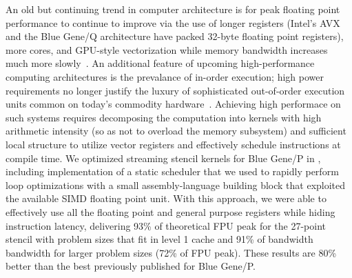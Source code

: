 An old \cite{mccalpin2007stream} but continuing trend in computer architecture is for peak floating point performance to continue to improve via the use of longer registers (Intel's AVX and the Blue Gene/Q architecture have packed 32-byte floating point registers), more cores, and GPU-style vectorization while memory bandwidth increases much more slowly~\cite{keyes2011exaflop}.
An additional feature of upcoming high-performance computing architectures is the prevalance of in-order execution; high power requirements no longer justify the luxury of sophisticated out-of-order execution units common on today's commodity hardware~\cite{seiler2008larrabee,pham2006overview}.
Achieving high performace on such systems requires decomposing the computation into kernels with high arithmetic intensity (so as not to overload the memory subsystem) and sufficient local structure to utilize vector registers and effectively schedule instructions at compile time.
We optimized streaming stencil kernels for Blue Gene/P in \cite{malas2011streaming}, including implementation of a static scheduler that we used to rapidly perform loop optimizations with a small assembly-language building block that exploited the available SIMD floating point unit.
With this approach, we were able to effectively use all the floating point and general purpose registers while hiding instruction latency, delivering 93\% of theoretical FPU peak for the 27-point stencil with problem sizes that fit in level 1 cache and 91\% of bandwidth bandwidth for larger problem sizes (72\% of FPU peak).
These results are 80\% better than the best previously published for Blue Gene/P.

